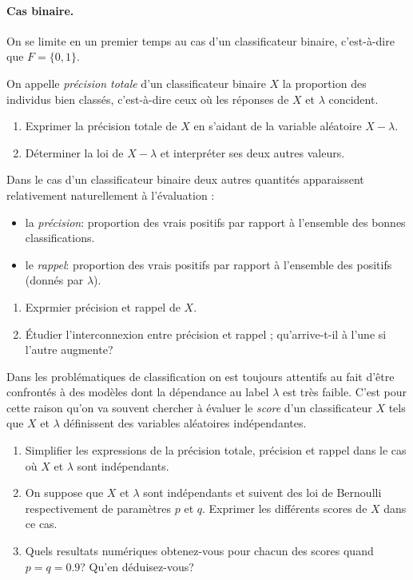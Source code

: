 \documentclass[11pt, a4paper]{article}
\begin{document}
\paragraph{Cas binaire.} On se limite en un premier temps au cas d'un
classificateur binaire, c'est-à-dire que $F = \{0, 1\}$.
\begin{question}
  On appelle \emph{précision totale} d'un classificateur binaire $X$
  la proportion des individus bien classés, c'est-à-dire ceux où les
  réponses de $X$ et $\lambda$ concident.
  \begin{enumerate}
  \item Exprimer la précision totale de $X$ en s'aidant de la variable
    aléatoire $X - \lambda$.
  \item Déterminer la loi de $X-\lambda$ et interpréter ses deux
    autres valeurs.
  \end{enumerate}
\end{question}
Dans le cas d'un classificateur binaire deux autres quantités
apparaissent relativement naturellement à l'évaluation :
\begin{itemize}
\item la \emph{précision}: proportion des vrais positifs par
  rapport à l'ensemble des bonnes classifications.
\item le \emph{rappel}: proportion des vrais positifs par rapport
  à l'ensemble des positifs (donnés par $\lambda$).
\end{itemize}
\begin{question}
  \begin{enumerate}
  \item Exprmier précision et rappel de $X$.
  \item Étudier l'interconnexion entre précision et rappel ;
    qu'arrive-t-il à l'une si l'autre augmente?
  \end{enumerate}
\end{question}
Dans les problématiques de classification on est toujours attentifs au
fait d'être confrontés à des modèles dont la dépendance au label
$\lambda$ est très faible. C'est pour cette raison qu'on va souvent
chercher à évaluer le \emph{score} d'un classificateur $X$ tels que
$X$ et $\lambda$ définissent des variables aléatoires indépendantes.
\begin{question}
  \begin{enumerate}
  \item Simplifier les expressions de la précision totale, précision
    et rappel dans le cas où $X$ et $\lambda$ sont indépendants.
  \item On suppose que $X$ et $\lambda$ sont indépendants et suivent
    des loi de Bernoulli respectivement de paramètres $p$ et
    $q$. Exprimer les différents scores de $X$ dans ce cas.
  \item Quels resultats numériques obtenez-vous pour chacun des scores
    quand $p=q=0.9$? Qu'en déduisez-vous?
  \end{enumerate}
\end{question}
\end{document}
